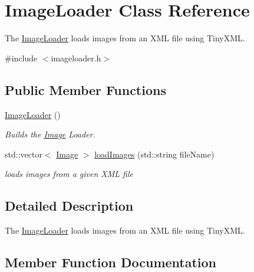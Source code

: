 \hypertarget{class_image_loader}{}\section{Image\+Loader Class Reference}
\label{class_image_loader}


The \hyperlink{class_image_loader}{Image\+Loader} loads images from an X\+ML file using Tiny\+X\+ML.  




{\ttfamily \#include $<$imageloader.\+h$>$}

\subsection*{Public Member Functions}
\begin{DoxyCompactItemize}
\item 
\hyperlink{class_image_loader_af0e70316989d3992c23ea52cd337c9ad}{Image\+Loader} ()\hypertarget{class_image_loader_af0e70316989d3992c23ea52cd337c9ad}{}\label{class_image_loader_af0e70316989d3992c23ea52cd337c9ad}

\begin{DoxyCompactList}\small\item\em Builds the \hyperlink{class_image}{Image} Loader. \end{DoxyCompactList}\item 
std\+::vector$<$ \hyperlink{class_image}{Image} $>$ \hyperlink{class_image_loader_ae81f649971d3638f12be412dce0fd11f}{load\+Images} (std\+::string file\+Name)
\begin{DoxyCompactList}\small\item\em loads images from a given X\+ML file \end{DoxyCompactList}\end{DoxyCompactItemize}


\subsection{Detailed Description}
The \hyperlink{class_image_loader}{Image\+Loader} loads images from an X\+ML file using Tiny\+X\+ML. 

\subsection{Member Function Documentation}

